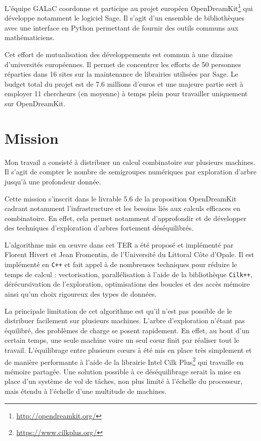 \documentclass[12pt,a4paper]{report}
\begin{document}
L'équipe GALaC coordonne et participe au projet européen OpenDreamKit\footnote{\url{http://opendreamkit.org/}} qui développe notamment le logiciel Sage. Il s'agit d'un ensemble de bibliothèques avec une interface en Python permettant de fournir des outils communs aux mathématiciens.

Cet effort de mutualisation des développements est commun à une dizaine d'universités européennes. Il permet de concentrer les efforts de 50 personnes réparties dans 16 sites sur la maintenance de librairies utilisées par Sage. Le budget total du projet est de 7.6 millions d'euros et une majeure partie sert à employer 11 chercheurs (en moyenne) à temps plein pour travailler uniquement sur OpenDreamKit.

\section{Mission}
Mon travail a consisté à distribuer un calcul combinatoire sur plusieurs machines. Il s'agit de compter le nombre de semigroupes numériques par exploration d'arbre jusqu'à une profondeur donnée.

Cette mission s'inscrit dans le livrable 5.6 de la proposition OpenDreamKit cadrant notamment l'infrastructure et les besoins liés aux calculs efficaces en combinatoire. En effet, cela permet notamment d'approfondir et de développer des techniques d'exploration d'arbres fortement déséquilibrés.

L'algorithme mis en \oe{}uvre dans cet TER a été proposé et implémenté par Florent Hivert et Jean Fromentin, de l'Université du Littoral Côte d'Opale. Il est implémenté en \texttt{C++} et fait appel à de nombreuses techniques pour réduire le temps de calcul : vectorisation, parallélisation à l'aide de la bibliothèque \texttt{Cilk++}, dérécursivation de l'exploration, optimisations des boucles et des accès mémoire ainsi qu'un choix rigoureux des types de données.

La principale limitation de cet algorithme est qu'il n'est pas possible de le distribuer facilement sur plusieurs machines. L'arbre d'exploration n'étant pas équilibré, des problèmes de charge se posent rapidement. En effet, au bout d'un certain temps, une seule machine voire un seul c\oe{}ur finit par réaliser tout le travail. L'équilibrage entre plusieurs c\oe{}urs à été mis en place très simplement et de manière performante à l'aide de la librairie Intel Cilk Plus\footnote{\url{https://www.cilkplus.org/}} qui travaille en mémoire partagée. Une solution possible à ce déséquilibrage serait la mise en place d'un système de vol de tâches, non plus limité à l'échelle du processeur, mais étendu à l'échelle d'une multitude de machines.
\end{document}
